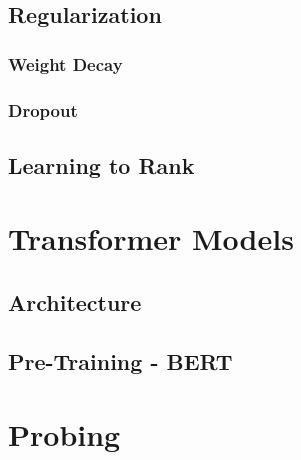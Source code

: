\subsection{Regularization}
\subsubsection{Weight Decay}
\subsubsection{Dropout}

\subsection{Learning to Rank}


\section{Transformer Models}
\subsection{Architecture}
\subsection{Pre-Training - BERT}

\section{Probing}
